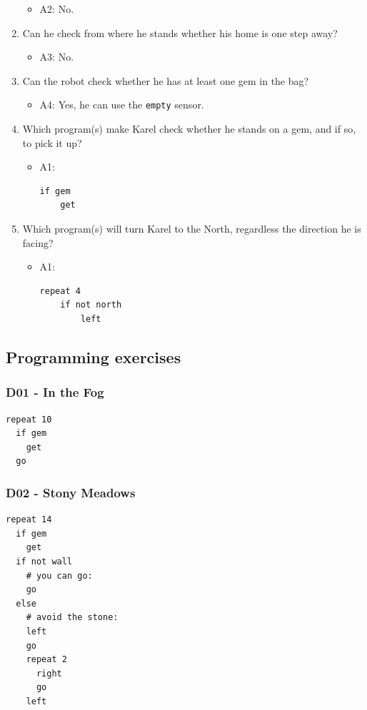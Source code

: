 \documentclass[article,A4,12pt]{llncs}
\begin{document}
\begin{enumerate}
  \begin{itemize}
    \item A2: No.
  \end{itemize}
\item Can he check from where he stands whether his home is one step away?
  \begin{itemize}
    \item A3: No.
  \end{itemize}
\item Can the robot check whether he has at least one gem in the bag?
  \begin{itemize}
    \item A4: Yes, he can use the {\tt empty} sensor.
  \end{itemize}
\item Which program(s) make Karel check whether he stands on a gem, and if so, to pick it up?
  \begin{itemize}
    \item A1:
\begin{verbatim}
if gem
    get
\end{verbatim}
  \end{itemize}
\item Which program(s) will turn Karel to the North, regardless the direction he is facing?
  \begin{itemize}
    \item A1:
\begin{verbatim}
repeat 4
    if not north 
        left
\end{verbatim}
  \end{itemize}
\end{enumerate}

\subsection{Programming exercises}

\subsubsection{D01 - In the Fog}
\begin{verbatim}
repeat 10
  if gem
    get
  go
\end{verbatim}

\subsubsection{D02 - Stony Meadows}
\begin{verbatim}
repeat 14
  if gem
    get
  if not wall
    # you can go:
    go
  else
    # avoid the stone:
    left
    go
    repeat 2
      right
      go
    left
\end{verbatim}
\end{document}
